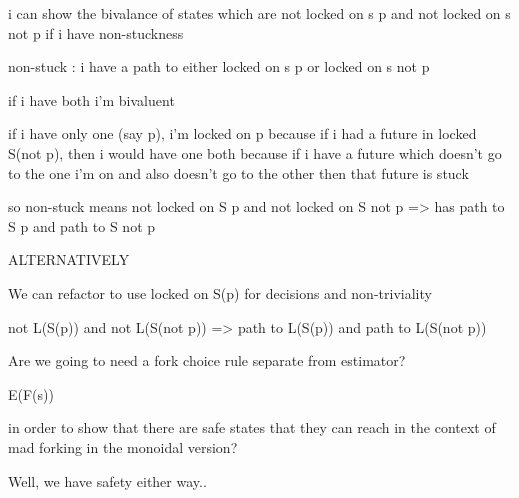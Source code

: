 \documentclass{article}
\theoremstyle{definition}
\begin{document}
i can show the bivalance of states which are not locked on s p and not locked on s not p if i have non-stuckness


non-stuck : i have a path to either locked on s p or locked on s not p

if i have both i'm bivaluent

if i have only one (say p), i'm locked on p
  because if i had a future in locked S(not p), then i would have one both
  because if i have a future which doesn't go to the one i'm on and also doesn't go to the other
  then that future is stuck


so non-stuck means not locked on S p and not locked on S not p => has path to S p and path to S not p





ALTERNATIVELY



We can refactor to use locked on S(p) for decisions and non-triviality

not L(S(p)) and not L(S(not p)) => path to L(S(p)) and path to L(S(not p))




Are we going to need a fork choice rule separate from estimator?

E(F(s))

in order to show that there are safe states that they can reach in the context of mad forking in the monoidal version?

Well, we have safety either way..



\fi



\iffalse
\end{document}
